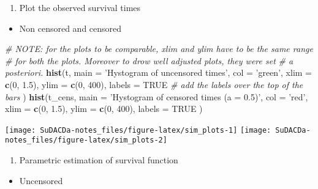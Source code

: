 \documentclass[]{book}
\newenvironment{Shaded}{\begin{snugshade}}{\end{snugshade}}
\newcommand{\KeywordTok}[1]{\textcolor[rgb]{0.13,0.29,0.53}{\textbf{{#1}}}}
\newcommand{\DataTypeTok}[1]{\textcolor[rgb]{0.13,0.29,0.53}{{#1}}}
\newcommand{\DecValTok}[1]{\textcolor[rgb]{0.00,0.00,0.81}{{#1}}}
\newcommand{\FloatTok}[1]{\textcolor[rgb]{0.00,0.00,0.81}{{#1}}}
\newcommand{\StringTok}[1]{\textcolor[rgb]{0.31,0.60,0.02}{{#1}}}
\newcommand{\CommentTok}[1]{\textcolor[rgb]{0.56,0.35,0.01}{\textit{{#1}}}}
\newcommand{\OtherTok}[1]{\textcolor[rgb]{0.56,0.35,0.01}{{#1}}}
\newcommand{\NormalTok}[1]{{#1}}
\providecommand{\tightlist}{%
  \setlength{\itemsep}{0pt}\setlength{\parskip}{0pt}}
\theoremstyle{definition}
\theoremstyle{definition}
\theoremstyle{definition}
\theoremstyle{remark}
\begin{document}
\begin{enumerate}
\def\labelenumi{\arabic{enumi}.}
\setcounter{enumi}{1}
\tightlist
\item
  Plot the observed survival times
\end{enumerate}

\begin{itemize}
\tightlist
\item
  Non censored and censored
\end{itemize}

\begin{Shaded}
\begin{Highlighting}[]
\CommentTok{# NOTE: for the plots to be comparable, xlim and ylim have to be the same range}
\CommentTok{#       for both the plots. Moreover to drow well adjusted plots, they were set}
\CommentTok{#       a posteriori.}
\KeywordTok{hist}\NormalTok{(t,}
  \DataTypeTok{main =} \StringTok{'Hystogram of uncensored times'}\NormalTok{,}
  \DataTypeTok{col  =} \StringTok{'green'}\NormalTok{,}
  \DataTypeTok{xlim =} \KeywordTok{c}\NormalTok{(}\DecValTok{0}\NormalTok{, }\FloatTok{1.5}\NormalTok{),}
  \DataTypeTok{ylim =} \KeywordTok{c}\NormalTok{(}\DecValTok{0}\NormalTok{, }\DecValTok{400}\NormalTok{),}
  \DataTypeTok{labels =} \OtherTok{TRUE}                        \CommentTok{# add the labels over the top of the bars}
\NormalTok{)}
\KeywordTok{hist}\NormalTok{(t_cens,}
  \DataTypeTok{main =} \StringTok{'Hystogram of censored times (a = 0.5)'}\NormalTok{,}
  \DataTypeTok{col  =} \StringTok{'red'}\NormalTok{,}
  \DataTypeTok{xlim =} \KeywordTok{c}\NormalTok{(}\DecValTok{0}\NormalTok{, }\FloatTok{1.5}\NormalTok{),}
  \DataTypeTok{ylim =} \KeywordTok{c}\NormalTok{(}\DecValTok{0}\NormalTok{, }\DecValTok{400}\NormalTok{),}
  \DataTypeTok{labels =} \OtherTok{TRUE}
\NormalTok{)}
\end{Highlighting}
\end{Shaded}

\texttt{[image: SuDACDa-notes\_files/figure-latex/sim\_plots-1]}
\texttt{[image: SuDACDa-notes\_files/figure-latex/sim\_plots-2]}

\begin{enumerate}
\def\labelenumi{\arabic{enumi}.}
\setcounter{enumi}{2}
\tightlist
\item
  Parametric estimation of survival function
\end{enumerate}

\begin{itemize}
\tightlist
\item
  Uncensored
\end{itemize}
\end{document}
